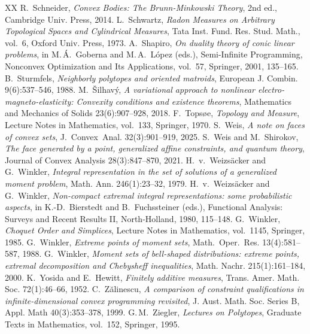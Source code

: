 \documentclass[a4paper,11pt,reqno]{amsart}
\numberwithin{equation}{section}
\theoremstyle{plain}
\theoremstyle{definition}
\begin{document}
\begin{thebibliography}{XX}
R.~Schneider, 
\emph{Convex Bodies: The Brunn-Minkowski Theory}, 
2nd ed.,
Cambridge Univ. Press, 2014.
%
L.~Schwartz, 
\emph{Radon Measures on Arbitrary Topological Spaces and Cylindrical Measures}, 
Tata Inst. Fund. Res. Stud. Math., vol.~6, 
Oxford Univ. Press, 1973.
%
A.~Shapiro,
\emph{On duality theory of conic linear problems},
in M.\,\'A.~Goberna and M.\,A.~L\'opez (eds.), Semi-Infinite Programming, 
Nonconvex Optimization and Its Applications, vol.~57, 
Springer, 2001, 135--165.
%
B.~Sturmfels,
\emph{Neighborly polytopes and oriented matroids},
European J. Combin. 9(6):537--546, 1988.
%
M.~\v{S}ilhav\'{y}, 
\emph{A variational approach to nonlinear electro-magneto-elasticity: 
Convexity conditions and existence theorems},
Mathematics and Mechanics of Solids 23(6):907--928, 2018.
%
F.~Tops{\o}e,
\emph{Topology and Measure}, 
Lecture Notes in Mathematics, 
vol.~133, Springer, 1970.
%
S.~Weis,
\emph{A note on faces of convex sets},
J.~Convex~Anal. 32(3):901--919, 2025.
%
S.~Weis and M.~Shirokov,
\emph{The face generated by a point, generalized affine constraints, and quantum theory},
Journal of Convex Analysis 28(3):847--870, 2021.
%
H.~v.~Weizs\"{a}cker and G.~Winkler, 
\emph{Integral representation in the set of solutions of a generalized 
moment problem},
Math. Ann. 246(1):23--32, 1979.
%
H.~v.~Weizs\"{a}cker and G.~Winkler,
\emph{Non-compact extremal integral representations: some probabilistic aspects},
in K.-D.~Bierstedt and  B.~Fuchssteiner (eds.),
Functional Analysis: Surveys and Recent Results II,  
North-Holland, 1980, 115--148.
%
G.~Winkler,
\emph{Choquet Order and Simplices},
Lecture Notes in Mathematics, vol.~1145,
Springer, 1985.
% 
G.~Winkler,
\emph{Extreme points of moment sets},
Math.~Oper.~Res. 13(4):581--587, 1988.
%
G.~Winkler, 
\emph{Moment sets of bell-shaped distributions: 
extreme points, extremal decomposition and Chebysheff inequalities},
Math. Nachr. 215(1):161--184, 2000.
%
K.~Yosida and E.~Hewitt,
\emph{Finitely additive measures},
Trans. Amer. Math. Soc. 72(1):46--66, 1952.
%
C.~Z\u{a}linescu, 
\emph{A comparison of constraint qualifications in infinite-dimensional convex programming 
revisited},
J. Aust. Math. Soc. Series B, Appl. Math 40(3):353--378, 1999.
%
G.\,M.~Ziegler, 
\emph{Lectures on Polytopes}, 
Graduate Texts in Mathematics, vol.~152, Springer, 1995.
%
\end{thebibliography}
%
%
\end{document}

